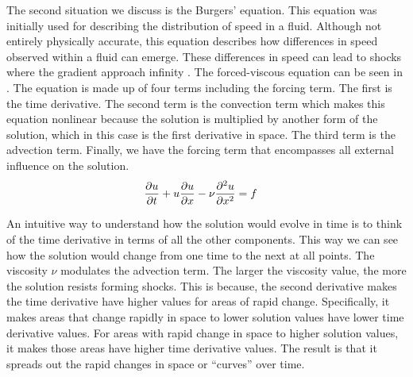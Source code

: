 The second situation we discuss is the Burgers' equation. This equation was initially used for describing the distribution of speed in a fluid. Although not entirely physically accurate, this equation describes how differences in speed observed within a fluid can emerge. These differences in speed can lead to shocks where the gradient approach infinity \autocite{orlandiBurgersEquation2000}. The forced-viscous equation can be seen in . The equation is made up of four terms including the forcing term. The first is the time derivative. The second term is the convection term which makes this equation nonlinear because the solution is multiplied by another form of the solution, which in this case is the first derivative in space. The third term is the advection term. Finally, we have the forcing term that encompasses all external influence on the solution.
\begin{align}
  \pdv{u}{t}+u\pdv{u}{x}-\nu\pdv[2]{u}{x} & = f \label{eq:forced_viscous_burgers}
\end{align}

An intuitive way to understand how the solution would evolve in time is to think of the time derivative in terms of all the other components. This way we can see how the solution would change from one time to the next at all points. The viscosity \(\nu \) modulates the advection term. The larger the viscosity value, the more the solution resists forming shocks. This is because, the second derivative makes the time derivative have higher values for areas of rapid change. Specifically, it makes areas that change rapidly in space to lower solution values have lower time derivative values. For areas with rapid change in space to higher solution values, it makes those areas have higher time derivative values. The result is that it spreads out the rapid changes in space or \enquote{curves} over time.

